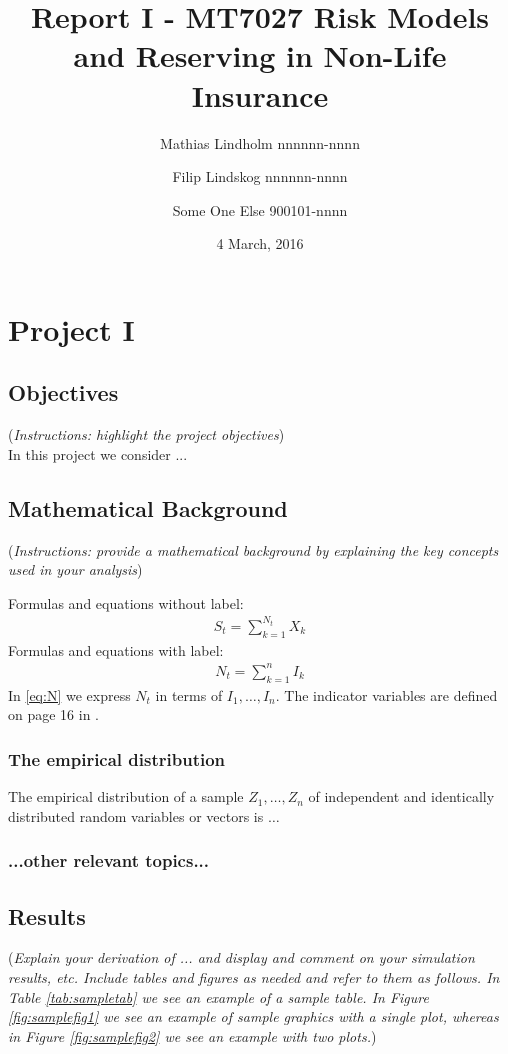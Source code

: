 \documentclass[11pt]{article}
\title{Report I - MT7027 Risk Models and Reserving in Non-Life Insurance}
\author{Mathias Lindholm nnnnnn-nnnn \and Filip Lindskog nnnnnn-nnnn \and Some One Else 900101-nnnn}
\date{4 March, 2016}                                           %
\begin{document}
\maketitle
\section*{Project I}
\subsection*{Objectives}
({\it Instructions: highlight the project objectives})
\\
In this project we consider ...

\subsection*{Mathematical Background}
({\it Instructions: provide a mathematical background by explaining the key concepts used in your analysis})

Formulas and equations without label:
\begin{align*}
	S_t = \sum_{k=1}^{N_t} X_k
\end{align*}
Formulas and equations with label:
\begin{align}\label{eq:N}
	N_t = \sum_{k=1}^{n} I_k
\end{align}
In \eqref{eq:N} we express $N_t$ in terms of $I_1,\dots,I_n$. The indicator variables are defined on page 16 in \cite{Wuthrich-Merz-13}.

\subsubsection*{The empirical distribution}
The empirical distribution of a sample $Z_1, \dots, Z_n$ of independent and identically distributed random variables or vectors is $\ldots$

\subsubsection*{...other relevant topics...}

\subsection*{Results}

({\it Explain your derivation of ... and display and comment on your simulation results, etc. Include tables and figures as needed and refer to them as follows. In Table \ref{tab:sampletab} we see an example of a sample table. In Figure \ref{fig:samplefig1} we see an example of sample graphics with a single plot, whereas in Figure \ref{fig:samplefig2} we see an example with two plots.}) 
\end{document}
